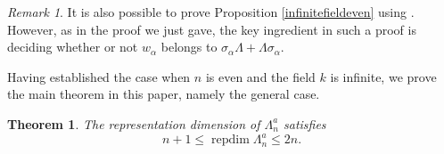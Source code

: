 \documentclass[a4paper]{amsart}
\newtheorem{theorem}{Theorem}[section]
\theoremstyle{definition}
\theoremstyle{definition}
\theoremstyle{definition}
\theoremstyle{definition}
\theoremstyle{definition}
\theoremstyle{definition}
\theoremstyle{remark}
\newtheorem*{remark}{Remark}
\theoremstyle{remark}
\theoremstyle{definition}
\theoremstyle{definition}
\begin{document}
\begin{remark}
It is also possible to prove Proposition \ref{infinitefieldeven}
using \cite[Theorem 1(b)]{Oppermann2}. However, as in the proof we
just gave, the key ingredient in such a proof is deciding whether or
not $w_{\alpha}$ belongs to $\sigma_{\alpha} \Lambda + \Lambda
\sigma_{\alpha}$.
\end{remark}

Having established the case when $n$ is even and the field $k$ is
infinite, we prove the main theorem in this paper, namely the
general case.

\begin{theorem}\label{infinitefieldodd}
The representation dimension of $\Lambda_n^a$ satisfies
$$n+1 \le {\operatorname{repdim}\nolimits} \Lambda_n^a \le 2n.$$
\end{theorem}
\end{document}
